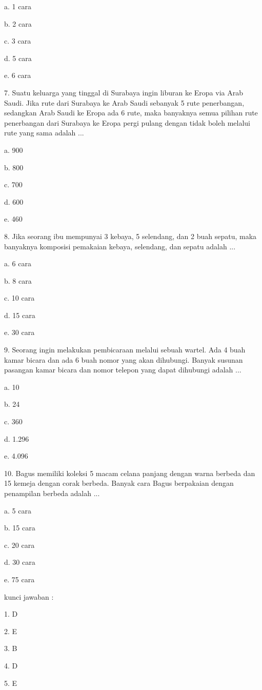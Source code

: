 \documentclass[11pt,fleqn]{book} %
\begin{document}
a.	1 cara

b.	2 cara

c.	3 cara

d.	5 cara

e.	6 cara


7. Suatu keluarga yang tinggal di Surabaya ingin liburan ke Eropa via Arab Saudi. Jika rute dari Surabaya ke Arab Saudi sebanyak 5 rute penerbangan, sedangkan Arab Saudi ke Eropa ada 6 rute, maka banyaknya semua pilihan rute penerbangan dari Surabaya ke Eropa pergi pulang dengan tidak boleh melalui rute yang sama adalah ... 

a.	900

b.	800

c.	700

d.	600

e.	460


8. Jika seorang ibu mempunyai 3 kebaya, 5 selendang, dan 2 buah sepatu, maka banyaknya komposisi pemakaian kebaya, selendang, dan sepatu adalah ... 

a.	6 cara

b.	8 cara

c.	10 cara

d.	15 cara

e.	30 cara

9. Seorang ingin melakukan pembicaraan melalui sebuah wartel. Ada 4 buah kamar bicara dan ada 6 buah nomor yang akan dihubungi. Banyak susunan pasangan kamar bicara dan nomor telepon yang dapat dihubungi adalah ... 

a.	10

b.	24

c.	360

d.	1.296

e.	4.096

10. Bagus memiliki koleksi 5 macam celana panjang dengan warna berbeda dan 15 kemeja dengan corak berbeda. Banyak cara Bagus berpakaian dengan penampilan berbeda adalah ... 

a.	5 cara

b.	15 cara

c.	20 cara

d.	30 cara

e.	75 cara



kunci jawaban :

1. D

2. E

3. B 

4. D

5. E
\end{document}

